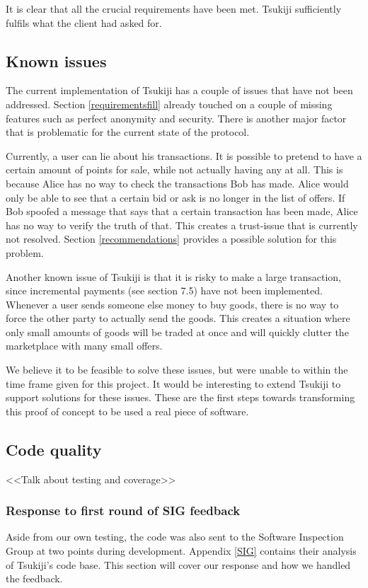 It is clear that all the crucial requirements have been met.
Tsukiji sufficiently fulfils what the client had asked for.

\subsection{Known issues}
\label{knownissues}
The current implementation of Tsukiji has a couple of issues that have not been addressed.
Section \ref{requirementsfill} already touched on a couple of missing features such as perfect anonymity and security.
There is another major factor that is problematic for the current state of the protocol.

Currently, a user can lie about his transactions.
It is possible to pretend to have a certain amount of points for sale, while not actually having any at all.
This is because Alice has no way to check the transactions Bob has made.
Alice would only be able to see that a certain bid or ask is no longer in the list of offers.
If Bob spoofed a message that says that a certain transaction has been made, Alice has no way to verify the truth of that.
This creates a trust-issue that is currently not resolved.
Section \ref{recommendations} provides a possible solution for this problem.

Another known issue of Tsukiji is that it is risky to make a large transaction, since incremental payments (see section 7.5) have not been implemented.
Whenever a user sends someone else money to buy goods, there is no way to force the other party to actually send the goods.
This creates a situation where only small amounts of goods will be traded at once and will quickly clutter the marketplace with many small offers.

We believe it to be feasible to solve these issues, but were unable to within the time frame given for this project.
It would be interesting to extend Tsukiji to support solutions for these issues.
These are the first steps towards transforming this proof of concept to be used a real piece of software.


\subsection{Code quality}
<<Talk about testing and coverage>>

\subsubsection{Response to first round of SIG feedback}
Aside from our own testing, the code was also sent to the Software Inspection Group at two points during development.
Appendix \ref{SIG} contains their analysis of Tsukiji's code base.
This section will cover our response and how we handled the feedback.

